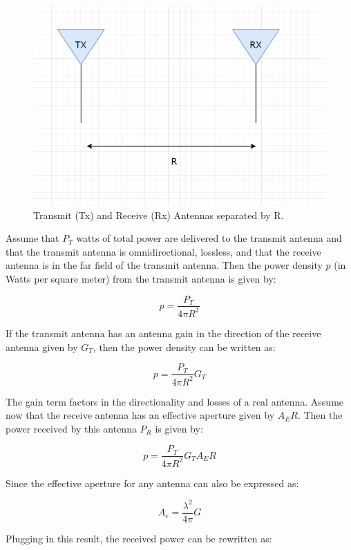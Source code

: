 \documentclass[a4paper,12pt]{report}
\begin{document}
\begin{figure}
  \begin{center}
    \includegraphics[clip, keepaspectratio, width=0.5\linewidth]{img/friis_equation.png}
    \caption{Transmit (Tx) and Receive (Rx) Antennas separated by R.}
    \label{fig:friis_equation}
  \end{center}
\end{figure}

Assume that $P_T$ watts of total power are delivered
to the transmit antenna and that the transmit antenna is omnidirectional, lossless,
and that the receive antenna is in the far field of the transmit antenna.
Then the power density $p$ (in Watts per square meter)
from the transmit antenna is given by:

\begin{equation}
  p = \frac{P_T}{4\pi R^2}
\end{equation}

If the transmit antenna has an antenna gain
in the direction of the receive antenna given by $G_T$,
then the power density can be written as:

\begin{equation}
  p = \frac{P_T}{4\pi R^2} G_T
\end{equation}

The gain term factors in the directionality and losses of a real antenna.
Assume now that the receive antenna has an effective aperture given by $A_ER$.
Then the power received by this antenna $P_R$ is given by:

\begin{equation}
  p = \frac{P_T}{4\pi R^2} G_T A_ER
\end{equation}

Since the effective aperture for any antenna can also be expressed as:

\begin{equation}
  A_e = \frac{\lambda ^ 2}{4 \pi} G
\end{equation}

Plugging in this result, the received power can be rewritten as:
\end{document}
